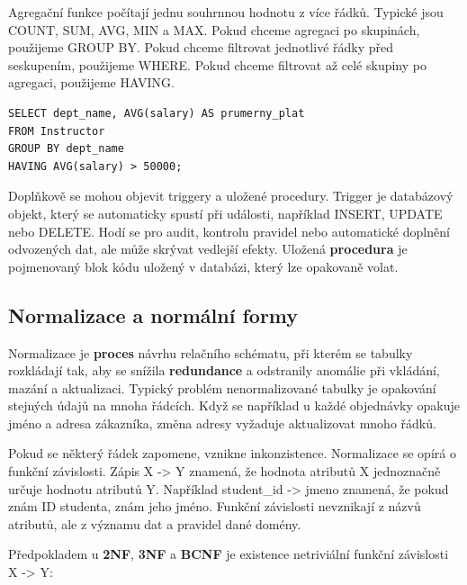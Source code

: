 Agregační funkce počítají jednu souhrnnou hodnotu z více řádků. Typické jsou COUNT, SUM, AVG, MIN a MAX. Pokud chceme agregaci po skupinách, použijeme GROUP BY. Pokud chceme filtrovat jednotlivé řádky před seskupením, použijeme WHERE. Pokud chceme filtrovat až celé skupiny po agregaci, použijeme HAVING.

\begin{codebox}
\small
\begin{verbatim}
SELECT dept_name, AVG(salary) AS prumerny_plat
FROM Instructor
GROUP BY dept_name
HAVING AVG(salary) > 50000;
\end{verbatim}
\end{codebox}

Doplňkově se mohou objevit triggery a uložené procedury. Trigger je databázový objekt, který se automaticky spustí při události, například INSERT, UPDATE nebo DELETE. Hodí se pro audit, kontrolu pravidel nebo automatické doplnění odvozených dat, ale může skrývat vedlejší efekty. Uložená \textbf{procedura} je pojmenovaný blok kódu uložený v databázi, který lze opakovaně volat.

\subsection*{Normalizace a normální formy}

Normalizace je \textbf{proces} návrhu relačního schématu, při kterém se tabulky rozkládají tak, aby se snížila \textbf{redundance} a odstranily anomálie při vkládání, mazání a aktualizaci. Typický problém nenormalizované tabulky je opakování stejných údajů na mnoha řádcích. Když se například u každé objednávky opakuje jméno a adresa zákazníka, změna adresy vyžaduje aktualizovat mnoho řádků.

Pokud se některý řádek zapomene, vznikne inkonzistence. Normalizace se opírá o funkční závislosti. Zápis X -> Y znamená, že hodnota atributů X jednoznačně určuje hodnotu atributů Y. Například student\_id -> jmeno znamená, že pokud znám ID studenta, znám jeho jméno. Funkční závislosti nevznikají z názvů atributů, ale z významu dat a pravidel dané domény.

Předpokladem u \textbf{2NF}, \textbf{3NF} a \textbf{BCNF} je existence netriviální funkční závislosti X -> Y:

